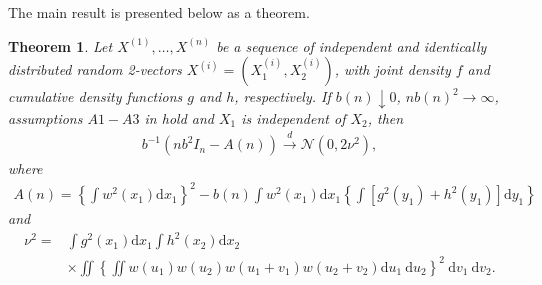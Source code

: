 \documentclass{article}
\newtheorem{Theorem}{Theorem}[section]
\begin{document}
The main result is presented below as a theorem.
\begin{Theorem}
    Let $X^{(1)}, \dots, X^{(n)}$ be a sequence of independent and identically distributed random 2-vectors $X^{(i)} = (X_1^{(i)}, X_2^{(i)})$, with joint density $f$ and cumulative density functions $g$ and $h$, respectively. If $b(n) \downarrow 0$, $n b(n)^2 \to \infty$, assumptions $A1-A3$ in \cite{rosenblatt1992nonparametric} hold and $X_1$ is independent of $X_2$, then
    \begin{align}
        b^{-1} (nb^2 I_n - A(n)) \xrightarrow{d} \mathcal{N}(0, 2 \nu^2),
    \end{align}
    where
    \begin{align}
        A(n)=\left\{\int w^2\left(x_1\right) \mathrm{d} x_1\right\}^2-b(n) \int w^2\left(x_1\right) \mathrm{d} x_1\left\{\int\left[g^2\left(y_1\right)+h^2\left(y_1\right)\right] \mathrm{d} y_1\right\}
    \end{align}
    and
    \begin{align}
        \nu^2= & \int g^2\left(x_1\right) \mathrm{d} x_1 \int h^2\left(x_2\right) \mathrm{d} x_2 \\
        & \times \iint\left\{\iint w\left(u_1\right) w\left(u_2\right) w\left(u_1+v_1\right) w\left(u_2+v_2\right) \mathrm{d} u_1 \mathrm{~d} u_2\right\}^2 \mathrm{~d} v_1 \mathrm{~d} v_2.
    \end{align}
\end{Theorem}
\end{document}
